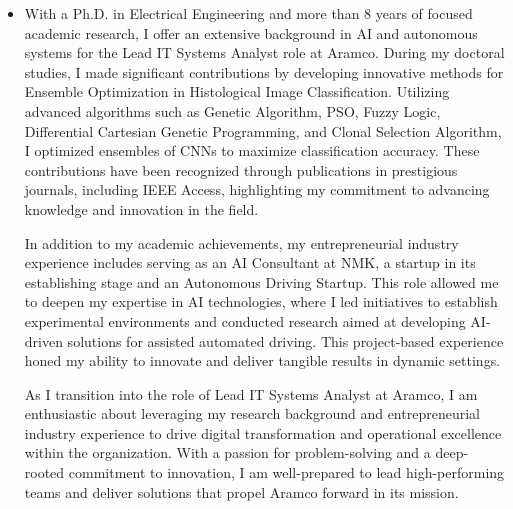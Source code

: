 \documentclass[letterpaper,
		10pt]{article}
\begin{document}
\begin{itemize} 
  \item
With a Ph.D. in Electrical Engineering and more than 8 years of focused academic research, I offer an extensive background in AI and autonomous systems for the Lead IT Systems Analyst role at Aramco.
During my doctoral studies, I made significant contributions by developing innovative methods for Ensemble Optimization in Histological Image Classification. Utilizing advanced algorithms such as Genetic Algorithm, PSO, Fuzzy Logic, Differential Cartesian Genetic Programming, and Clonal Selection Algorithm, I optimized ensembles of CNNs to maximize classification accuracy. These contributions have been recognized through publications in prestigious journals, including IEEE Access, highlighting my commitment to advancing knowledge and innovation in the field.

In addition to my academic achievements, my entrepreneurial industry experience includes serving as an AI Consultant at NMK, a startup in its establishing stage and an Autonomous Driving Startup. This role allowed me to deepen my expertise in AI technologies, where I led initiatives to establish experimental environments and conducted research aimed at developing AI-driven solutions for assisted automated driving. This project-based experience honed my ability to innovate and deliver tangible results in dynamic settings.

As I transition into the role of Lead IT Systems Analyst at Aramco, I am enthusiastic about leveraging my research background and entrepreneurial industry experience to drive digital transformation and operational excellence within the organization. With a passion for problem-solving and a deep-rooted commitment to innovation, I am well-prepared to lead high-performing teams and deliver solutions that propel Aramco forward in its mission.









\end{itemize}
\end{document}
